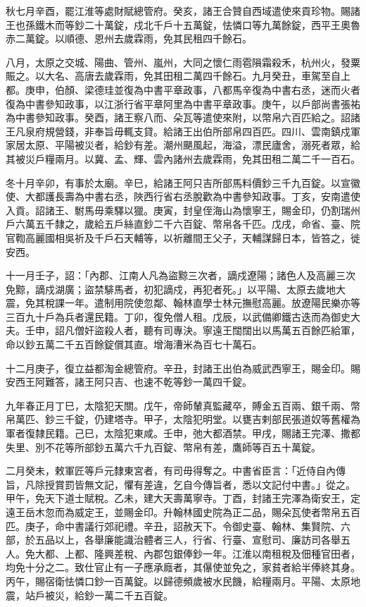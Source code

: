 \begin{pinyinscope}
 秋七月辛酉，罷江淮等處財賦總管府。癸亥，諸王合贊自西域遣使來貢珍物。賜諸王也孫鐵木而等鈔二十萬錠，戍北千戶十五萬錠，怯憐口等九萬餘錠，西平王奧魯赤二萬錠。以順德、恩州去歲霖雨，免其民租四千餘石。



 八月，太原之交城、陽曲、管州、嵐州，大同之懷仁雨雹隕霜殺禾，杭州火，發粟賑之。以大名、高唐去歲霖雨，免其田租二萬四千餘石。九月癸丑，車駕至自上都。庚申，伯顏、梁德珪並復為中書平章政事，八都馬辛復為中書右丞，迷而火者復為中書參知政事，以江浙行省平章阿里為中書平章政事。庚午，以戶部尚書張祐為中書參知政事。癸酉，諸王察八而、朵瓦等遣使來附，以幣帛六百匹給之。詔諸王凡泉府規營錢，非奉旨毋輒支貸。給諸王出伯所部帛四百匹。四川、雲南鎮戍軍家居太原、平陽被災者，給鈔有差。潮州颶風起，海溢，漂民廬舍，溺死者眾，給其被災戶糧兩月。以冀、孟、輝、雲內諸州去歲霖雨，免其田租二萬二千一百石。



 冬十月辛卯，有事於太廟。辛巳，給諸王阿只吉所部馬料價鈔三千九百錠。以宣徽使、大都護長壽為中書右丞，陜西行省右丞脫歡為中書參知政事。丁亥，安南遣使入貢。詔諸王、駙馬毋乘驛以獵。庚寅，封皇侄海山為懷寧王，賜金印，仍割瑞州戶六萬五千隸之，歲給五戶絲直鈔二千六百錠、幣帛各千匹。戊戌，命省、臺、院官鞫高麗國相吳祈及千戶石天輔等，以祈離間王父子，天輔謀歸日本，皆笞之，徙安西。



 十一月壬子，詔：「內郡、江南人凡為盜黥三次者，謫戍遼陽；諸色人及高麗三次免黥，謫戍湖廣；盜禁騑馬者，初犯謫戍，再犯者死。」以平陽、太原去歲地大震，免其稅課一年。遣制用院使忽鄰、翰林直學士林元撫慰高麗。放遼陽民樂亦等三百九十戶為兵者還民籍。丁卯，復免僧人租。戊辰，以武備卿鐵古迭而為御史大夫。壬申，詔凡僧奸盜殺人者，聽有司專決。寧遠王闊闊出以馬萬五百餘匹給軍，命以鈔五萬二千五百餘錠償其直。增海漕米為百七十萬石。



 十二月庚子，復立益都淘金總管府。辛丑，封諸王出伯為威武西寧王，賜金印。賜安西王阿難答，諸王阿只吉、也速不乾等鈔一萬四千錠。



 九年春正月丁巳，太陰犯天關。戊午，帝師輦真監藏卒，賻金五百兩、銀千兩、幣帛萬匹、鈔三千錠，仍建塔寺。甲子，太陰犯明堂。以甕吉剌部民張道奴等舊權為軍者復隸民籍。己巳，太陰犯東咸。壬申，弛大都酒禁。甲戌，賜諸王完澤、撒都失里、別不花等所部鈔五萬六千九百錠、幣帛有差，鷹師等百五十萬錠。



 二月癸未，敕軍匠等戶元隸東宮者，有司毋得奪之。中書省臣言：「近侍自內傳旨，凡除授賞罰皆無文記，懼有差違，乞自今傳旨者，悉以文記付中書。」從之。甲午，免天下道士賦稅。乙未，建大天壽萬寧寺。丁酉，封諸王完澤為衛安王，定遠王岳木忽而為威定王，並賜金印。升翰林國史院為正二品，賜朵瓦使者幣帛五百匹。庚子，命中書議行郊祀禮。辛丑，詔赦天下。令御史臺、翰林、集賢院、六部，於五品以上，各舉廉能識治體者三人，行省、行臺、宣慰司、廉訪司各舉五人。免大都、上都、隆興差稅、內郡包銀俸鈔一年。江淮以南租稅及佃種官田者，均免十分之二。致仕官止有一子應承廕者，其儤使並免之，家貧者給半俸終其身。丙午，賜宿衛怯憐口鈔一百萬錠。以歸德頻歲被水民饑，給糧兩月。平陽、太原地震，站戶被災，給鈔一萬二千五百錠。




\end{pinyinscope}
